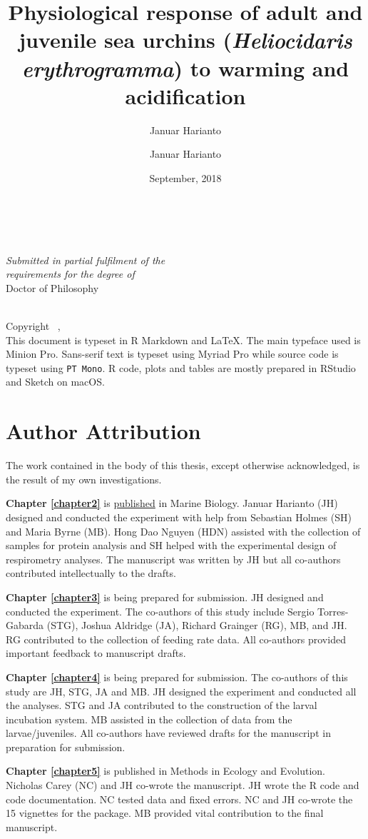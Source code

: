 \documentclass[
  oneside, 11pt, a4paper]{memoir}
\title{Physiological response of adult and juvenile sea urchins (\textit{Heliocidaris erythrogramma}) to warming and acidification}
\author{Januar Harianto}
\date{September, 2018}
\author{Januar Harianto}
\date{}
\makeatletter
\newcommand{\smartcopyright}[1]{\begingroup%
	\pagebreak%
	\thispagestyle{empty}%
	\footnotesize%
	\par\vspace*{\fill}%
	\hspace{-1.1cm}%
	\parbox{10cm}{%
		\noindent%
		\@title \\[.2cm]
		Copyright \textcopyright\ \the\year, \@author\\[0.5cm]
		{#1}%
	}%
\endgroup}
\newcommand\@institution{}
\newcommand{\smarttitle}{
{\begingroup
\thispagestyle{empty}
\makeatletter
\center
\vspace*{22 mm}
{\Huge {\@title}\\}
\vfill
{\Large \@author\\}
\vspace{5 mm}
{\Large \@date}
\vfill
{\large \itshape {Submitted in partial fulfilment of the\\ requirements for the degree of}} \\
\vskip 0.2in
{\large Doctor of Philosophy}
\vskip 0.2in
{\large \itshape{\@institution}}
\vfill
\makeatother
\endgroup}}
\makeatother
\begin{document}
\frontmatter

\smarttitle
\restoregeometry

\SingleSpacing

\smartcopyright{This document is typeset in R Markdown and \LaTeX. The main typeface used is Minion Pro. Sans-serif text is typeset using \textsf{Myriad Pro} while source code is typeset using \texttt{PT Mono}. R code, plots and tables are mostly prepared in RStudio and Sketch on macOS.}

\OnehalfSpacing

\clearpage

\SingleSpacing


\section*{Author Attribution}

The work contained in the body of this thesis, except otherwise acknowledged, is the result of my own investigations. 

\textbf{Chapter \ref{chapter2}} is \href{https://doi.org/10/gdqdv4}{published} in Marine Biology. 
Januar Harianto (JH) designed and conducted the experiment with help from Sebastian Holmes (SH) and Maria Byrne (MB).
Hong Dao Nguyen (HDN) assisted with the collection of samples for protein analysis and SH helped with the experimental design of respirometry analyses. 
The manuscript was written by JH but all co-authors contributed intellectually to the drafts.

\textbf{Chapter \ref{chapter3}} is being prepared for submission. 
JH designed and conducted the experiment. 
The co-authors of this study include Sergio Torres-Gabarda (STG), Joshua Aldridge (JA), Richard Grainger (RG), MB, and JH. 
RG contributed to the collection of feeding rate data. 
All co-authors provided important feedback to manuscript drafts.

\textbf{Chapter \ref{chapter4}} is being prepared for submission.
The co-authors of this study are JH, STG, JA and MB. 
JH designed the experiment and conducted all the analyses. 
STG and JA contributed to the construction of the larval incubation system.
MB assisted in the collection of data from the larvae/juveniles.
All co-authors have reviewed drafts for the manuscript in preparation for submission.

\textbf{Chapter \ref{chapter5}} is published in Methods in Ecology and Evolution.
Nicholas Carey (NC) and JH co-wrote the manuscript. 
JH wrote the R code and code documentation. 
NC tested data and fixed errors.
NC and JH co-wrote the 15 vignettes for the package. 
MB provided vital contribution to the final manuscript.
\end{document}
